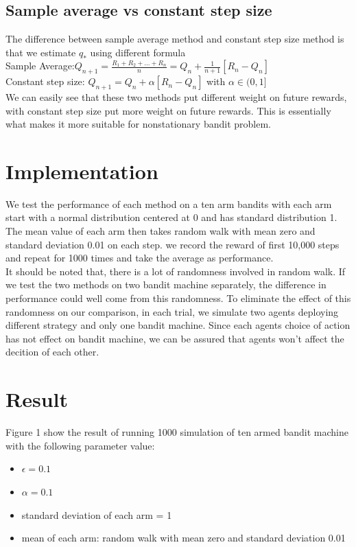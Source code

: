 \documentclass[12pt]{article}
\begin{document}
\subsection{Sample average vs constant step size}
The difference between sample average method and constant step size method is that we estimate $q_*$ using different formula \\
Sample Average:$Q_{n+1} = \frac{R_1+R_2+...+R_{n}}{n} = Q_{n} + \frac{1}{n+1}[R_n-Q_n]$\\
Constant step size: $Q_{n+1} = Q_{n} +\alpha[R_n-Q_n]$ with $\alpha \in (0,1]$\\
We can easily see that these two methods put different weight on future rewards, with constant step size put more weight on future rewards. This is essentially what makes it more suitable for nonstationary bandit problem.


\section{Implementation}
We test the performance of each method on a ten arm bandits with each arm start with a normal distribution centered at 0 and has standard distribution 1. The mean value of each arm then takes random walk with mean zero and standard deviation 0.01 on each step. we record the reward of first 10,000 steps and repeat for 1000 times and take the average as performance.\\

It should be noted that, there is a lot of randomness involved in random walk. If we test the two methods on two bandit machine separately, the difference in performance could well come from this randomness. To eliminate the effect of this randomness on our comparison, in each trial, we simulate two agents deploying different strategy and only one bandit machine. Since each agents choice of action has not effect on bandit machine, we can be assured that agents won't affect the decition of each other.


\section{Result}
Figure 1 show the result of running 1000 simulation of ten armed bandit machine with the following parameter value:\\
\begin{itemize}
\item $\epsilon = 0.1$
\item $\alpha = 0.1$
\item standard deviation of each arm = 1
\item mean of each arm: random walk with mean zero and standard deviation 0.01 
\end{itemize}
\end{document}
